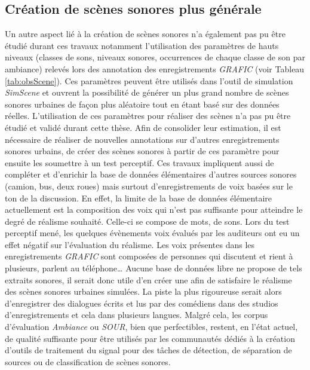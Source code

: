 \subsection*{Création de scènes sonores plus générale}
Un autre aspect lié à la création de scènes sonores n'a également pas pu être étudié durant ces travaux notamment l'utilisation des paramètres de hauts niveaux (classes de sons, niveaux sonores, occurrences de chaque classe de son par ambiance)  relevés lors des annotation des enregistrements \textit{GRAFIC} (voir Tableau \ref{tab:obsScene}).
Ces paramètres peuvent être utilisés dans l'outil de simulation \textit{SimScene} et ouvrent la possibilité de générer un plus grand nombre de scènes sonores urbaines de façon plus aléatoire tout en étant basé sur des données réelles. L'utilisation de ces paramètres pour réaliser des scènes n'a pas pu être étudié et validé durant cette thèse. Afin de consolider leur estimation, il est nécessaire de réaliser de nouvelles annotations sur d'autres enregistrements sonores urbains, de créer des scènes sonores à partir de ces paramètre pour ensuite les soumettre à un test perceptif.
Ces travaux impliquent aussi de compléter et d'enrichir la base de données élémentaires d'autres sources sonores (camion, bus, deux roues) mais surtout d'enregistrements de voix basées sur le ton de la discussion. En effet, la limite de la base de données élémentaire actuellement est la composition des voix qui n'est pas suffisante pour atteindre le degré de réalisme souhaité. Celle-ci se compose de mots, de sons. Lors du test perceptif mené, les quelques évènements voix évalués par les auditeurs ont eu un effet négatif sur l'évaluation du réalisme. Les voix présentes dans les enregistrements \textit{GRAFIC} sont composées de personnes qui discutent et rient à plusieurs, parlent au téléphone\dots{} 
Aucune base de données libre ne propose de tels extraits sonores, il serait donc utile d'en créer une afin de satisfaire le réalisme des scènes sonores urbaines simulées. La piste la plus rigoureuse serait alors d'enregistrer des dialogues écrits et lus par des comédiens dans des studios d'enregistrements et cela dans plusieurs langues. Malgré cela, les corpus d'évaluation \textit{Ambiance} ou \textit{SOUR}, bien que perfectibles, restent, en l'état actuel, de qualité suffisante pour être utilisés par les communautés dédiés à la création d'outils de traitement du signal pour des tâches de détection, de séparation de sources ou de classification de scènes sonores.

